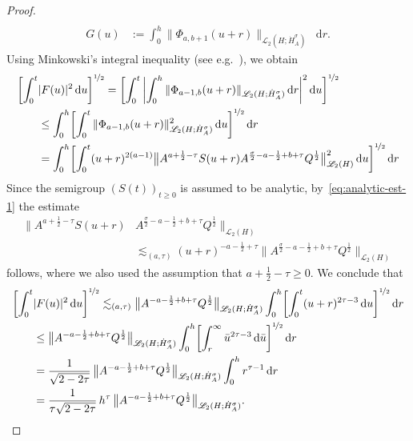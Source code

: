 \documentclass[reqno]{amsart}
\numberwithin{equation}{section}
\newcommand{\norm}[2]{     \| #1       \|_{ #2 }}
\newcommand{\rd}{\mathop{}\!\mathrm{d}}
\newcommand{\Hdot}[1]{\dot{H}^{#1}_A}
\theoremstyle{remark}
\theoremstyle{definition}
\begin{document}
\begin{proof}
\begin{align*}
	\\ 
	G(u) 
	&:= 
	\int_0^h 
	\norm{\Phi_{a,b+1}(u+r)}{\mathscr L_2(H;\dot H_A^\sigma)} \rd r. 
	\end{align*} 
	Using Minkowski's integral inequality 
	(see e.g.~\cite[\S{}A.1]{Stein1970}), 
	we obtain 
	\begin{align*}
	\biggl[\int_0^t &|F(u)|^2 \rd u \biggr]^{\nicefrac{1}{2}} 
	= 
	\biggl[\int_0^t \,
	\biggl| \int_0^h 
	\| \Phi_{a-1,b}(u+r) \|_{\mathscr L_2(H;\Hdot\sigma)} \rd r \biggr|^2 
	\rd u\biggr]^{\nicefrac{1}{2}} 
	\\
	&\leq 
	\int_0^h \biggl[ 
	\int_0^t 
	\| \Phi_{a-1,b}(u+r) \|_{\mathscr L_2(H;\Hdot\sigma)}^2 \rd u
	\biggr]^{\nicefrac{1}{2}} \rd r 
	\\
	&= 
	\int_0^h \biggl[ 
	\int_0^t (u+r)^{2(a-1)} 
	\bigl\| A^{a+\frac{1}{2}-\tau} S(u+r) A^{\frac{\sigma}{2}-a-\frac{1}{2}+b+\tau} Q^{\frac{1}{2}} \bigr\|_{ 
		\mathscr L_2(H)}^2 
	\rd u\biggr]^{\nicefrac{1}{2}} \rd r 
	\end{align*} 
	Since the semigroup $(S(t))_{t\geq 0}$ is assumed to be analytic, 
	by~\eqref{eq:analytic-est-1} the estimate 
	\begin{equation}\label{eq:proof:emma:I-2:3} 
	\begin{split} 
	\bigl\| A^{a+\frac{1}{2}-\tau} S(u+r) &A^{\frac{\sigma}{2} -a-\frac{1}{2}+b+\tau} 
	Q^{\frac{1}{2}} \bigr\|_{ \mathscr L_2(H) } 
	\\
	&\lesssim_{(a,\tau)}
	(u+r)^{-a-\frac{1}{2}+\tau} 
	\bigl\| A^{\frac{\sigma}{2} -a-\frac{1}{2}+b+\tau} Q^{\frac{1}{2}} \bigr\|_{ 
		\mathscr L_2(H)} 
	\end{split} 
	\end{equation} 
	follows, where we also used the assumption that $a+\frac{1}{2}-\tau\geq 0$. 
	We conclude that 
	\begin{align*} 
	\biggl[\int_0^t &|F(u)|^2 \rd u \biggr]^{\nicefrac{1}{2}} 
	\lesssim_{(a,\tau)} 
	\bigl\| A^{-a-\frac{1}{2}+b+\tau} Q^{\frac{1}{2}} \bigr\|_{  
		\mathscr L_2(H;\Hdot\sigma)} 
	\int_0^h \biggl[ 
	\int_0^t 
	(u+r)^{2\tau-3} 
	\rd u\biggr]^{\nicefrac{1}{2}} \rd r 
	\\
	&\leq 
	\bigl\| A^{-a-\frac{1}{2}+b+\tau} Q^{\frac{1}{2}} \bigr\|_{  
		\mathscr L_2(H;\Hdot\sigma)} 
	\int_0^h \biggl[ 
	\int_r^\infty 
	\bar{u}^{2\tau-3} 
	\rd \bar{u}\biggr]^{\nicefrac{1}{2}} \rd r 
	\\
	&=  
	\frac{1}{\sqrt{2 - 2\tau}} \, 
	\bigl\| A^{-a-\frac{1}{2}+b+\tau} Q^{\frac{1}{2}} \bigr\|_{ 
		\mathscr L_2(H;\Hdot\sigma)} 
	\int_0^h r^{\tau-1}\rd r 
	\\
	&= 
	\frac{1}{\tau \sqrt{2 - 2\tau}} \, 
	h^\tau \, 
	\bigl\| A^{-a-\frac{1}{2}+b+\tau} Q^{\frac{1}{2}} \bigr\|_{ 
		\mathscr L_2(H;\Hdot\sigma)} . 
	\end{align*}
	

\end{proof}
\end{document}

